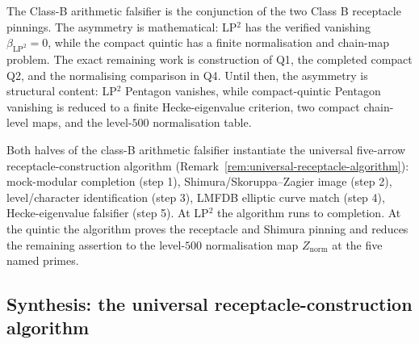 \begin{remark}
\label{rem:class-B-asymmetric-scope}
The Class-B arithmetic falsifier is the
conjunction of the two Class B receptacle pinnings. The asymmetry is
mathematical: LP$^{2}$ has the verified vanishing
\(\beta_{\mathrm{LP}^2}=0\), while the compact quintic has a finite
normalisation and chain-map problem. The exact remaining work is construction of
\textup{Q1}, the completed compact \textup{Q2}, and the normalising
comparison in \textup{Q4}. Until then, the asymmetry is structural content:
LP$^{2}$ Pentagon vanishes, while compact-quintic Pentagon vanishing is
reduced to a finite Hecke-eigenvalue criterion, two compact chain-level maps,
and the level-$500$ normalisation table.
\end{remark}

\begin{remark}
\label{rem:class-B-receptacle-algorithm}
Both halves of the class-B arithmetic falsifier
instantiate the universal five-arrow receptacle-construction algorithm
\textup{(}Remark~\ref{rem:universal-receptacle-algorithm}\textup{):}
mock-modular completion \textup{(}step 1\textup{)},
Shimura/Skoruppa--Zagier image \textup{(}step 2\textup{)}, level/character
identification \textup{(}step 3\textup{)}, LMFDB elliptic curve match
\textup{(}step 4\textup{)}, Hecke-eigenvalue falsifier \textup{(}step
5\textup{).} At LP$^{2}$ the algorithm runs to completion. At the
quintic the algorithm proves the receptacle and Shimura pinning and
reduces the remaining assertion to the level-$500$ normalisation map
$Z_{\mathrm{norm}}$ at the five named primes.
\end{remark}

\subsection{Synthesis: the universal receptacle-construction algorithm}
\label{subsec:universal-receptacle-algorithm}

